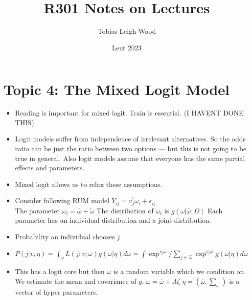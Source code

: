 \documentclass[12pt]{article}
\date{Lent 2023}
\title{R301 Notes on Lectures}
\author{Tobias Leigh-Wood}
\begin{document}
\maketitle
\section*{Topic 4: The Mixed Logit Model}

\begin{itemize}
      \item Reading is important for mixed logit. Train is essential. (I HAVENT DONE THIS)
      \item Logit models suffer from independence of irrelevant alternatives. So the odds ratio can be just the ratio between two options --- but this is not going to be true in general.
            Also logit models assume that everyone has the same partial effects and parameters.
      \item Mixed logit allows us to relax these assumptions.
      \item Consider following RUM model $Y_{ij} = v^\prime_j \omega_{i} + \epsilon_{ij}$ \\
            The parameter $\omega_{i} = \bar{\omega} + \tilde{\omega}$
            The distribution of  $\omega_{i}$ is $g(\omega|\bar{\omega}, \varOmega)$
            Each parameter has an individual distribution and a joint distribution.
      \item Probability an individual chooses $j$
      \item $P(j|v, \eta) = \int_{\omega} L(j; v;\omega)g(\omega|\eta)d\omega = \int \exp^{v_j\omega}/\sum_{j \in \Sigma} \exp^{v_j\omega} g(\omega|\eta) d\omega$
      \item This has a logit core but then $\omega$ is a random variable which we condition on.
            We estimate the mean and covariance of $g$. $\omega = \bar{\omega} + \Lambda\zeta$
            $\eta = (\bar{\omega}, \sum _{\omega})$ is a vector of hyper parameters.


\end{itemize}
\end{document}
